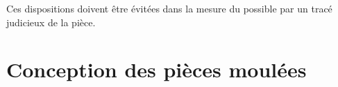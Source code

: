 \documentclass[11pt,oneside]{article}
\begin{document}
Ces dispositions doivent être évitées dans la mesure du possible par un tracé
judicieux de la pièce.

\begin{center}
\end{center}

\begin{center}
\end{center}

\section{Conception des pièces moulées}
\end{document}
